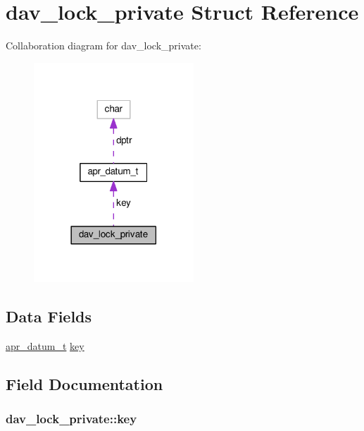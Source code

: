 \hypertarget{structdav__lock__private}{}\section{dav\+\_\+lock\+\_\+private Struct Reference}
\label{structdav__lock__private}


Collaboration diagram for dav\+\_\+lock\+\_\+private\+:
\nopagebreak
\begin{figure}[H]
\begin{center}
\leavevmode
\includegraphics[width=170pt]{structdav__lock__private__coll__graph}
\end{center}
\end{figure}
\subsection*{Data Fields}
\begin{DoxyCompactItemize}
\item 
\hyperlink{structapr__datum__t}{apr\+\_\+datum\+\_\+t} \hyperlink{structdav__lock__private_a85a5cbbf2d7ce590f7c9b07f62348f2b}{key}
\end{DoxyCompactItemize}


\subsection{Field Documentation}
\subsubsection[{\texorpdfstring{key}{key}}]{ dav\+\_\+lock\+\_\+private\+::key}\hypertarget{structdav__lock__private_a85a5cbbf2d7ce590f7c9b07f62348f2b}{}\label{structdav__lock__private_a85a5cbbf2d7ce590f7c9b07f62348f2b}


